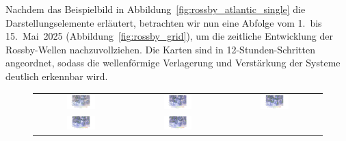 Nachdem das Beispielbild in Abbildung~\ref{fig:rossby_atlantic_single} die 
Darstellungselemente erläutert, betrachten wir nun eine Abfolge vom 1.\ bis 15.\ Mai~2025 
(Abbildung~\ref{fig:rossby_grid}), um die zeitliche Entwicklung der Rossby-Wellen 
nachzuvollziehen. Die Karten sind in 12-Stunden-Schritten angeordnet, sodass die 
wellenförmige Verlagerung und Verstärkung der Systeme deutlich erkennbar wird.


\begin{figure}
	\centering
	\renewcommand{\arraystretch}{0.5}
	\begin{tabular}{ccc}
		\includegraphics[width=0.32\textwidth, trim=5.75cm 3cm 5cm 0.9cm, clip]{papers/rossby/images/weather/data_2025_5_1_00:00_500.pdf} &
		\includegraphics[width=0.32\textwidth, trim=5.75cm 3cm 5cm 0.9cm, clip]{papers/rossby/images/weather/data_2025_5_1_12:00_500.pdf} &
		\includegraphics[width=0.32\textwidth, trim=5.75cm 3cm 5cm 0.9cm, clip]{papers/rossby/images/weather/data_2025_5_2_00:00_500.pdf}   \\
		\includegraphics[width=0.32\textwidth, trim=5.75cm 3cm 5cm 0.9cm, clip]{papers/rossby/images/weather/data_2025_5_2_12:00_500.pdf} &
		\includegraphics[width=0.32\textwidth, trim=5.75cm 3cm 5cm 0.9cm, clip]{papers/rossby/images/weather/data_2025_5_3_00:00_500.pdf} &

\end{tabular}
\end{figure}
